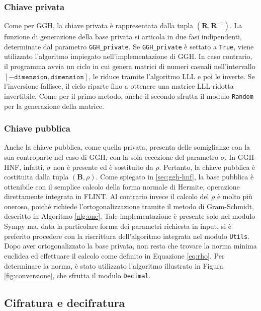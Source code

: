 \subsubsection{Chiave privata}

Come per GGH, la chiave privata è rappresentata dalla tupla $(\mathbf{R}, \mathbf{R}^{-1})$.
La funzione di generazione della base privata si articola in due fasi indipendenti, 
determinate dal parametro \texttt{GGH\_private}. Se \texttt{GGH\_private}
è settato a \texttt{True}, viene utilizzato l'algoritmo impiegato nell'implementazione di GGH.
In caso contrario, il programma avvia un ciclo in cui genera matrici di numeri casuali 
nell'intervallo $[-\texttt{dimension},\texttt{dimension}]$, le riduce tramite l'algoritmo 
LLL e poi le inverte. Se l'inversione fallisce, il ciclo riparte fino a ottenere una 
matrice LLL-ridotta invertibile. 
Come per il primo metodo, anche il secondo sfrutta il modulo \texttt{Random} per la 
generazione della matrice.

\subsubsection{Chiave pubblica}

Anche la chiave pubblica, come quella privata, presenta delle somiglianze con la sua 
controparte nel caso di GGH, con la sola eccezione del parametro $\sigma$. 
In GGH-HNF, infatti, $\sigma$ non è presente ed è sostituito da $\rho$. 
Pertanto, la chiave pubblica è costituita dalla tupla $(\mathbf{B}, \rho)$. Come spiegato
in \ref{sec:ggh-hnf}, la base pubblica è ottenibile con il semplice calcolo della forma
normale di Hermite, operazione direttamente integrata in FLINT. Al contrario invece il 
calcolo del $\rho$ è molto più oneroso, poiché richiede l'ortogonalizzazione tramite il 
metodo di Gram-Schmidt, descritto in Algoritmo \ref{alg:one}. Tale implementazione è 
presente solo nel modulo Sympy ma, data la particolare forma dei parametri richiesta in input, 
si è preferito procedere con la riscrittura dell'algoritmo integrata nel modulo \texttt{Utils}.
Dopo aver ortogonalizzato la base privata, non resta che trovare la norma minima euclidea 
ed effettuare il calcolo come definito in Equazione \ref{eq:rho}. 
Per determinare la norma, è stato utilizzato l'algoritmo illustrato in Figura 
\ref{fig:conversione}, che sfrutta il modulo \texttt{Decimal}.

\subsection{Cifratura e decifratura}

